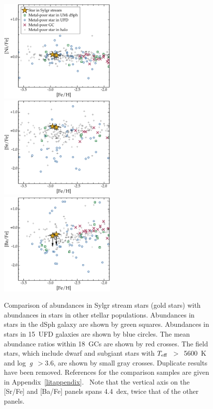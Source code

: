 \documentclass[twocolumn,tighten]{aastex62}
\newcommand{\logg}{\mbox{log~{\it g}}}
\newcommand{\teff}{\mbox{$T_{\rm eff}$}}
\begin{document}
\begin{figure}
\begin{center}
\vspace*{-0.231in}
\includegraphics[angle=0,width=2.27in]{fig3j.pdf}
\hspace*{0.02in}
\includegraphics[angle=0,width=2.27in]{fig3k.pdf} 
\hspace*{0.02in}
\includegraphics[angle=0,width=2.27in]{fig3l.pdf} 
\end{center}
\vspace{-4mm}
\caption{
\label{alphaplot}
Comparison of abundances in Sylgr stream stars (gold stars) 
with abundances in stars in other stellar populations.
Abundances in stars in the 
 dSph galaxy 
are shown by green squares.
Abundances in stars in 15~UFD galaxies
are shown by blue circles.
The mean abundance ratios within 18~GCs
are shown by red crosses.
The field stars,
which include dwarf and subgiant stars
with \teff~$>$~5600~K and \logg~$>$3.6,
are shown by small gray crosses.
Duplicate results have been removed.
References for the comparison samples are given in
Appendix~\ref{litappendix}.~
Note that the vertical axis on the [Sr/Fe] and [Ba/Fe] panels
spans 4.4~dex, twice that of
the other panels.
 }
\end{figure}
\end{document}
